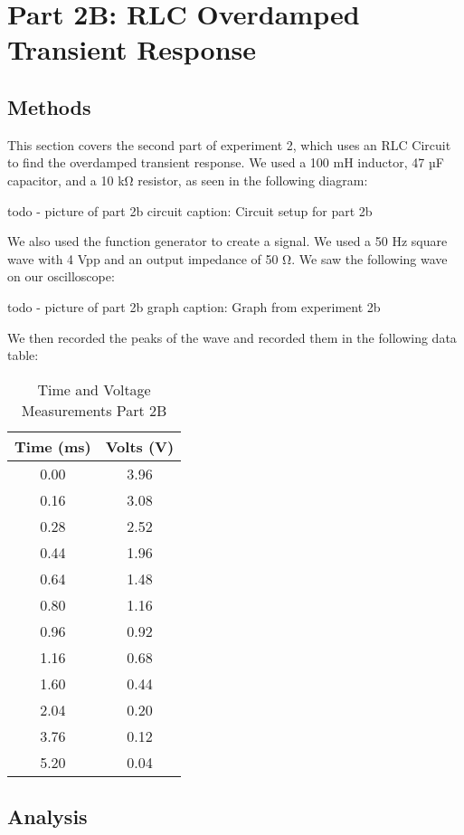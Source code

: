 \documentclass[11pt]{article}
\let\oldsection\section
\renewcommand\section{\clearpage\oldsection}
\begin{document}
    \section{Part 2B: RLC Overdamped Transient Response}\label{sec:part2b_overdamped}
    \subsection{Methods}\label{subsec:part2b_methods}
    This section covers the second part of experiment 2, which uses an RLC Circuit to find the overdamped transient response. We used a 100 mH inductor, 47 µF capacitor, and a 10 kΩ resistor, as seen in the following diagram:

    todo - picture of part 2b circuit
    caption: Circuit setup for part 2b

    We also used the function generator to create a signal. We used a 50 Hz square wave with 4 Vpp and an output impedance of 50 Ω. We saw the following wave on our oscilloscope:

    todo - picture of part 2b graph
    caption: Graph from experiment 2b

    We then recorded the peaks of the wave and recorded them in the following data table:

    \begin{table}[h]
    \centering
    \caption{Time and Voltage Measurements Part 2B}
    \begin{tabular}{cc}
    \toprule
    \textbf{Time (ms)} & \textbf{Volts (V)} \\
    \midrule
    0.00 & 3.96 \\
    0.16 & 3.08 \\
    0.28 & 2.52 \\
    0.44 & 1.96 \\
    0.64 & 1.48 \\
    0.80 & 1.16 \\
    0.96 & 0.92 \\
    1.16 & 0.68 \\
    1.60 & 0.44 \\
    2.04 & 0.20 \\
    3.76 & 0.12 \\
    5.20 & 0.04 \\
    \bottomrule
    \end{tabular}
    \end{table}

    
    \subsection{Analysis}\label{subsec:part2b_analysis}
\end{document}
